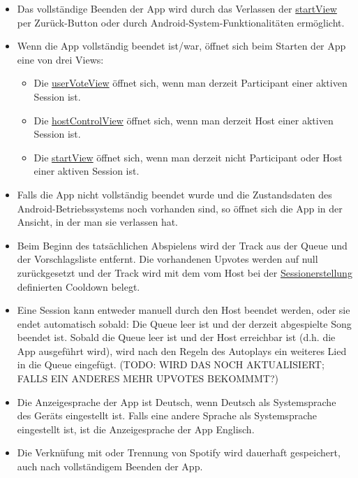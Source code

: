 \documentclass[oneside, ngerman]{sdqtechreport}
\begin{document}
\begin{itemize}
    \item <F 100> Das vollständige Beenden der App wird durch das Verlassen der \hyperlink{startView}{startView} per Zurück-Button oder durch Android-System-Funktionalitäten ermöglicht.
    \item <F 101> Wenn die App vollständig beendet ist/war, öffnet sich beim Starten der App eine von drei Views:
    \begin{itemize}
        \item Die \hyperlink{userVoteView}{userVoteView} öffnet sich, wenn man derzeit Participant einer aktiven Session ist.
        \item Die \hyperlink{hostControlView}{hostControlView} öffnet sich, wenn man derzeit Host einer aktiven Session ist.
        \item Die \hyperlink{startView}{startView} öffnet sich, wenn man derzeit nicht Participant oder Host einer aktiven Session ist.
    \end{itemize}
    \item <F 102> Falls die App nicht vollständig beendet wurde und die Zustandsdaten des Android-Betriebssystems noch vorhanden sind, so öffnet sich die App in der Ansicht, in der man sie verlassen hat.
    \item Beim Beginn des tatsächlichen Abspielens wird der Track aus der Queue und der Vorschlagsliste entfernt. Die vorhandenen Upvotes werden auf null zurückgesetzt und der Track wird mit dem vom Host bei der \hyperlink{hostModeSettingsView}{Sessionerstellung} definierten Cooldown belegt.
    \item Eine Session kann entweder manuell durch den Host beendet werden, oder sie endet automatisch sobald: Die Queue leer ist und der derzeit abgespielte Song beendet ist. Sobald die Queue leer ist und der Host erreichbar ist (d.h. die App ausgeführt wird), wird nach den Regeln des Autoplays ein weiteres Lied in die Queue eingefügt. (TODO: WIRD DAS NOCH AKTUALISIERT; FALLS EIN ANDERES MEHR UPVOTES BEKOMMMT?)
    \item Die Anzeigesprache der App ist Deutsch, wenn Deutsch als Systemsprache des Geräts eingestellt ist. Falls eine andere Sprache als Systemsprache eingestellt ist, ist die Anzeigesprache der App Englisch.
    \item Die Verknüfung mit oder Trennung von Spotify wird dauerhaft gespeichert, auch nach vollständigem Beenden der App.
\end{itemize}
\end{document}

